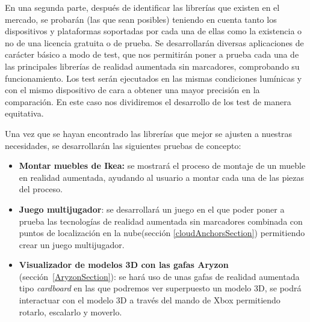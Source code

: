 En una segunda parte, después de identificar las librerías que existen en el mercado, se probarán (las que sean posibles) teniendo en cuenta tanto los dispositivos y plataformas soportadas por cada una de ellas como la existencia o no de una licencia gratuita o de prueba. Se desarrollarán diversas aplicaciones de carácter básico a modo de test, que nos permitirán poner a prueba cada una de las principales librerías de realidad aumentada sin marcadores, comprobando su funcionamiento. Los test serán ejecutados en las mismas condiciones lumínicas y con el mismo dispositivo de cara a obtener una mayor precisión en la comparación. En este caso nos dividiremos el desarrollo de los test de manera equitativa.\vspace{\baselineskip}

Una vez que se hayan encontrado las librerías que mejor se ajusten a nuestras necesidades, se desarrollarán las siguientes pruebas de concepto:
\begin{itemize}
\item \textbf{Montar muebles de Ikea:} se mostrará el proceso de montaje de un mueble en realidad aumentada, ayudando al usuario a montar cada una de las piezas del proceso.
\item \textbf{Juego multijugador}: se desarrollará un juego en el que poder poner a prueba las tecnologías de realidad aumentada sin marcadores combinada con puntos de localización en la nube(sección \ref{cloudAnchorsSection}) permitiendo crear un juego multijugador.
\item \textbf{Visualizador de modelos 3D con las gafas Aryzon} (sección~\ref{AryzonSection}): se hará uso de unas gafas de realidad aumentada tipo \textit{cardboard} en las que podremos ver superpuesto un modelo 3D, se podrá interactuar con el modelo 3D a través del mando de Xbox permitiendo rotarlo, escalarlo y moverlo.
\end{itemize}